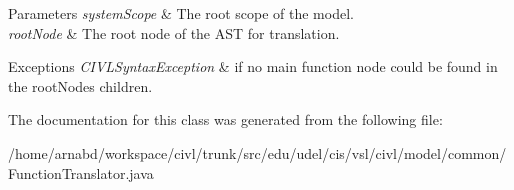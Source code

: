 \begin{DoxyParams}{Parameters}
{\em system\+Scope} & The root scope of the model. \\
\hline
{\em root\+Node} & The root node of the A\+S\+T for translation. \\
\hline
\end{DoxyParams}

\begin{DoxyExceptions}{Exceptions}
{\em C\+I\+V\+L\+Syntax\+Exception} & if no main function node could be found in the root\+Node\textquotesingle{}s children. \\
\hline
\end{DoxyExceptions}


The documentation for this class was generated from the following file\+:\begin{DoxyCompactItemize}
\item 
/home/arnabd/workspace/civl/trunk/src/edu/udel/cis/vsl/civl/model/common/Function\+Translator.\+java\end{DoxyCompactItemize}
